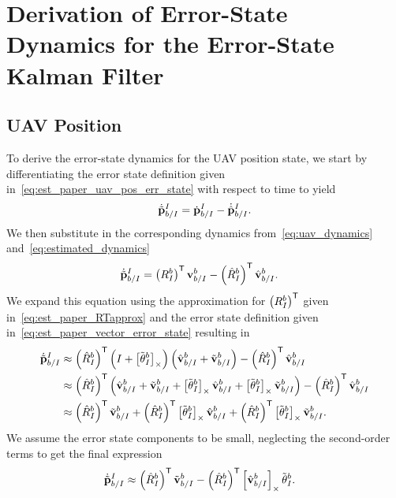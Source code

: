 \chapter{Derivation of Error-State Dynamics for the Error-State Kalman Filter}
\label{apdx:estimation_err_state_derivation}

\section{UAV Position}
To derive the error-state dynamics for the UAV position state, we start by
differentiating the error state definition given
in~\eqref{eq:est_paper_uav_pos_err_state} with respect to time to yield
\begin{equation}
  \dot{\tilde{\mathrm{\mathbf{p}}}}_{b/I}^I = \dot{\mathrm{\mathbf{p}}}_{b/I}^I - \dot{\hat{\mathrm{\mathbf{p}}}}_{b/I}^I.
\end{equation}
We then substitute in the corresponding dynamics from~\eqref{eq:uav_dynamics}
and~\eqref{eq:estimated_dynamics}
\begin{align}
  \dot{\tilde{\mathrm{\mathbf{p}}}}_{b/I}^I
  &=
  \left( R_I^b \right)^{\mathsf{T}} \mathrm{\mathbf{v}}_{b/I}^b
  - \left( \hat{R}_I^b \right)^{\mathsf{T}} \hat{\mathrm{\mathbf{v}}}_{b/I}^b.
\end{align}
We expand this equation using the approximation for $\left( R_I^b \right)^{\mathsf{T}}$ given
in~\eqref{eq:est_paper_RTapprox} and the error state definition given
in~\eqref{eq:est_paper_vector_error_state} resulting in
\begin{align}
  \dot{\tilde{\mathrm{\mathbf{p}}}}_{b/I}^I
  &\approx
  \left( \hat{R}_I^b \right)^{\mathsf{T}}
  \left( I + \left[ \tilde{\mathrm{\mathbf{\theta}}}_I^b \right]_{\times} \right)
  \left( \hat{\mathrm{\mathbf{v}}}_{b/I}^b + \tilde{\mathrm{\mathbf{v}}}_{b/I}^b \right)
  - \left( \hat{R}_I^b \right)^{\mathsf{T}} \hat{\mathrm{\mathbf{v}}}_{b/I}^b \\
  &\approx
  \left( \hat{R}_I^b \right)^{\mathsf{T}}
  \left( \hat{\mathrm{\mathbf{v}}}_{b/I}^b + \tilde{\mathrm{\mathbf{v}}}_{b/I}^b
  + \left[ \tilde{\mathrm{\mathbf{\theta}}}_I^b \right]_{\times} \hat{\mathrm{\mathbf{v}}}_{b/I}^b
  + \left[ \tilde{\mathrm{\mathbf{\theta}}}_I^b \right]_{\times} \tilde{\mathrm{\mathbf{v}}}_{b/I}^b \right)
  - \left( \hat{R}_I^b \right)^{\mathsf{T}} \hat{\mathrm{\mathbf{v}}}_{b/I}^b \\
  &\approx
  \left( \hat{R}_I^b \right)^{\mathsf{T}} \tilde{\mathrm{\mathbf{v}}}_{b/I}^b
  + \left( \hat{R}_I^b \right)^{\mathsf{T}} \left[ \tilde{\mathrm{\mathbf{\theta}}}_I^b \right]_{\times} \hat{\mathrm{\mathbf{v}}}_{b/I}^b
  + \left( \hat{R}_I^b \right)^{\mathsf{T}} \left[ \tilde{\mathrm{\mathbf{\theta}}}_I^b \right]_{\times} \tilde{\mathrm{\mathbf{v}}}_{b/I}^b.
\end{align}
We assume the error state components to be small, neglecting the second-order
terms to get the final expression
\begin{align}
  \dot{\tilde{\mathrm{\mathbf{p}}}}_{b/I}^I
  &\approx
  \left( \hat{R}_I^b \right)^{\mathsf{T}} \tilde{\mathrm{\mathbf{v}}}_{b/I}^b
  - \left( \hat{R}_I^b \right)^{\mathsf{T}} \left[ \hat{\mathrm{\mathbf{v}}}_{b/I}^b \right]_{\times}
  \tilde{\mathrm{\mathbf{\theta}}}_I^b.
\end{align}

